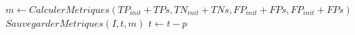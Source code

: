 {\begin{minipage}{0.75\linewidth}
\begin{algorithm}[H]
\begin{algorithmic}
            \State  $ m \gets CalculerMetriques(TP_{init}+TP{s},TN_{init}+TN{s},FP_{init}+FP{s},FP_{init}+FP{s})$
            \State  $ SauvegarderMetriques(I,t,m)$
            \State $ t \gets t - p$ 
               
          \EndWhile
      \end{algorithmic}

      \label{alg:calcul_metriques}
  \end{algorithm}
\end{minipage}
}








